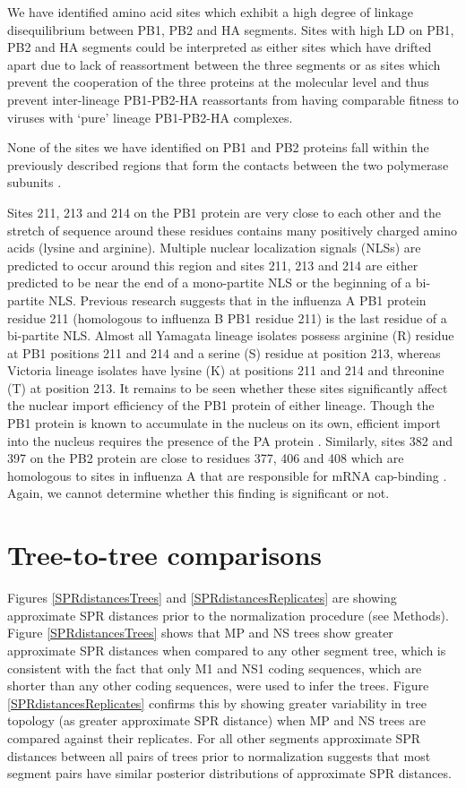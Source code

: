 \documentclass[11pt,oneside,letterpaper]{article}
\begin{document}
We have identified amino acid sites which exhibit a high degree of linkage disequilibrium between PB1, PB2 and HA segments.
Sites with high LD on PB1, PB2 and HA segments could be interpreted as either sites which have drifted apart due to lack of reassortment between the three segments or as sites which prevent the cooperation of the three proteins at the molecular level and thus prevent inter-lineage PB1-PB2-HA reassortants from having comparable fitness to viruses with `pure' lineage PB1-PB2-HA complexes.

None of the sites we have identified on PB1 and PB2 proteins fall within the previously described regions that form the contacts between the two polymerase subunits \cite{sugiyama2009}.

Sites 211, 213 and 214 on the PB1 protein are very close to each other and the stretch of sequence around these residues contains many positively charged amino acids (lysine and arginine).
Multiple nuclear localization signals (NLSs) are predicted to occur around this region and sites 211, 213 and 214 are either predicted to be near the end of a mono-partite NLS or the beginning of a bi-partite NLS.
Previous research \cite{nath1990} suggests that in the influenza A PB1 protein residue 211 (homologous to influenza B PB1 residue 211) is the last residue of a bi-partite NLS.
Almost all Yamagata lineage isolates possess arginine (R) residue at PB1 positions 211 and 214 and a serine (S) residue at position 213, whereas Victoria lineage isolates have lysine (K) at positions 211 and 214 and threonine (T) at position 213.
It remains to be seen whether these sites significantly affect the nuclear import efficiency of the PB1 protein of either lineage.
Though the PB1 protein is known to accumulate in the nucleus on its own, efficient import into the nucleus requires the presence of the PA protein \cite{fodor2004}.
Similarly, sites 382 and 397 on the PB2 protein are close to residues 377, 406 and 408 which are homologous to sites in influenza A that are responsible for mRNA cap-binding \cite{guilligay2008}.
Again, we cannot determine whether this finding is significant or not.

\section*{Tree-to-tree comparisons}

Figures \ref{SPRdistancesTrees} and \ref{SPRdistancesReplicates} are showing approximate SPR distances prior to the normalization procedure (see Methods).
Figure \ref{SPRdistancesTrees} shows that MP and NS trees show greater approximate SPR distances when compared to any other segment tree, which is consistent with the fact that only M1 and NS1 coding sequences, which are shorter than any other coding sequences, were used to infer the trees.
Figure \ref{SPRdistancesReplicates} confirms this by showing greater variability in tree topology (as greater approximate SPR distance) when MP and NS trees are compared against their replicates.
For all other segments approximate SPR distances between all pairs of trees prior to normalization suggests that most segment pairs have similar posterior distributions of approximate SPR distances.
\end{document}
